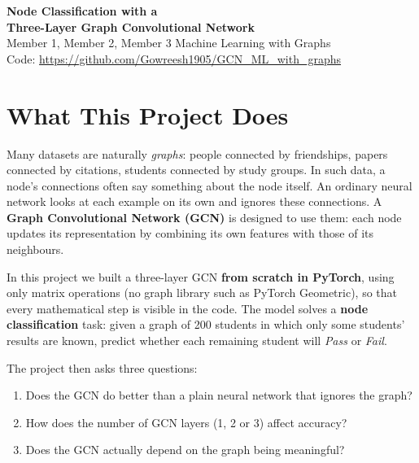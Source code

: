 \documentclass[11pt,a4paper]{article}
\begin{document}
\begin{center}
  {\LARGE\bfseries Node Classification with a\\[2pt] Three-Layer Graph Convolutional Network}\\[8pt]
  {\large Member 1, Member 2, Member 3 \quad\textbar\quad Machine Learning with Graphs}\\[2pt]
  {\small Code: \url{https://github.com/Gowreesh1905/GCN_ML_with_graphs}}
\end{center}
\vspace{4pt}

\section{What This Project Does}

Many datasets are naturally \emph{graphs}: people connected by friendships, papers connected by citations, students connected by study groups. In such data, a node's connections often say something about the node itself. An ordinary neural network looks at each example on its own and ignores these connections. A \textbf{Graph Convolutional Network (GCN)} is designed to use them: each node updates its representation by combining its own features with those of its neighbours.

In this project we built a three-layer GCN \textbf{from scratch in PyTorch}, using only matrix operations (no graph library such as PyTorch Geometric), so that every mathematical step is visible in the code. The model solves a \textbf{node classification} task: given a graph of 200 students in which only some students' results are known, predict whether each remaining student will \emph{Pass} or \emph{Fail}.

The project then asks three questions:
\begin{enumerate}
  \item Does the GCN do better than a plain neural network that ignores the graph?
  \item How does the number of GCN layers (1, 2 or 3) affect accuracy?
  \item Does the GCN actually depend on the graph being meaningful?
\end{enumerate}

\end{document}
